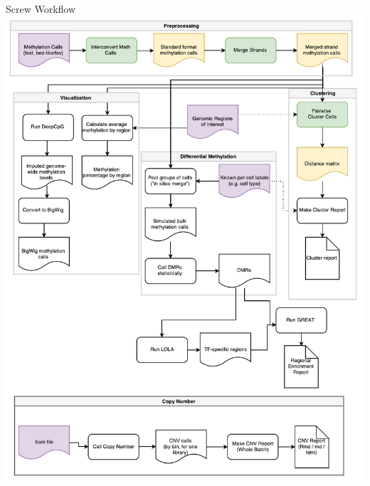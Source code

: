 \documentclass{beamer}
\begin{document}
\begin{frame}
\begin{columns}[t]
\begin{column}{.65\textwidth}
\begin{columns}[t,totalwidth=\textwidth]
	\begin{column}{.48\textwidth}
	
	\end{column}
  \end{columns}

	\begin{block}{Screw Workflow}
  \includegraphics[width=\textwidth]{figures/workflow_diagram.pdf}
  \end{block}
  \begin{columns}[t,totalwidth=\textwidth]


\begin{column}{.48\textwidth}
   


\end{column}
\end{columns}
\end{column}
\end{columns}
\end{frame}
\end{document}
